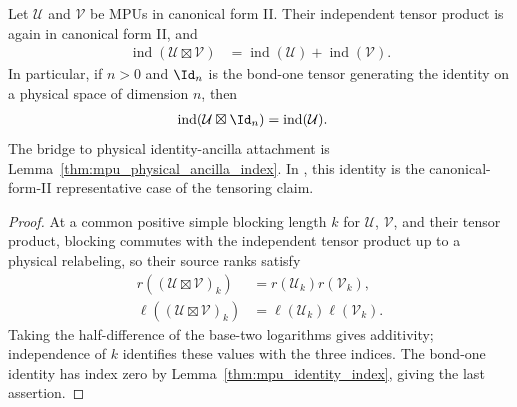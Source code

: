 \begin{lemma}
    \label{thm:mpu_admissible_index_tensor}
    \leanok
    Let $\mathcal U$ and $\mathcal V$ be MPUs in canonical form II. Their
    independent tensor product is again in canonical form II, and
    \begin{align}
        \operatorname{ind}(\mathcal U\boxtimes\mathcal V)
         & =\operatorname{ind}(\mathcal U)+\operatorname{ind}(\mathcal V).
    \end{align}
    In particular, if $n>0$ and $\Id_n$ is the bond-one tensor generating
    the identity on a physical space of dimension $n$, then
    \begin{align}
        \operatorname{ind}(\mathcal U\boxtimes\Id_n)
         & =\operatorname{ind}(\mathcal U).
    \end{align}
    The bridge to physical identity-ancilla attachment is
    Lemma~\ref{thm:mpu_physical_ancilla_index}.
    In \cite[Theorem~IV.6(ii)]{Cirac2017MPU}, this identity is the canonical-form-II representative case of the tensoring
    claim.
\end{lemma}

\begin{proof}\leanok
    At a common positive simple blocking length $k$ for $\mathcal U$,
    $\mathcal V$, and their tensor product, blocking commutes with the independent tensor product
    up to a physical relabeling, so their source ranks satisfy
    \begin{align}
        r((\mathcal U\boxtimes\mathcal V)_k)
         & =r(\mathcal U_k)r(\mathcal V_k),       \\
        \ell((\mathcal U\boxtimes\mathcal V)_k)
         & =\ell(\mathcal U_k)\ell(\mathcal V_k).
    \end{align}
    Taking the half-difference of the base-two logarithms gives additivity;
    independence of $k$ identifies these values with the three indices.
    The bond-one identity has index zero by
    Lemma~\ref{thm:mpu_identity_index}, giving the last assertion.
\end{proof}

